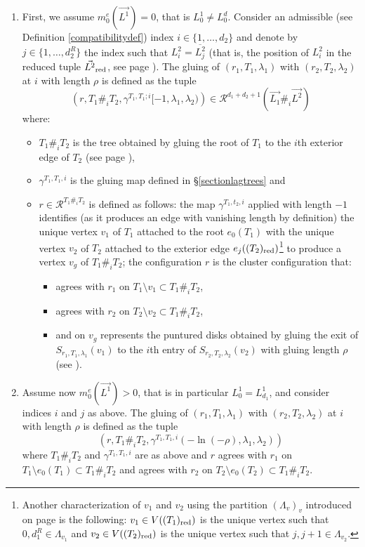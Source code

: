 \begin{enumerate}
	\item First, we assume $m_0^e(\vec{L^1})=0$, that is $L_0^1\neq L_0^d$. Consider an admissible (see Definition \ref{compatibilitydef}) index $i\in \{1,\ldots, d_2\}$ and denote by $j\in \{1,\ldots, d_2^R\}$ the index such that $L_i^2=\overline{L_j^2}$ (that is, the position of $L_i^2$ in the reduced tuple $\vec{L^2}_\textnormal{red}$, see page \pageref{defreducedtuple}). The gluing of $(r_1,T_1,\lambda_1)$ with $(r_2,T_2,\lambda_2)$ at $i$ with length $\rho$ is defined as the tuple $$\left(r,T_1\#_iT_2,\gamma^{T_1,T_1;i}[-1,\lambda_1,\lambda_2)\right)\in \mathcal{R}^{d_1+d_2+1}(\vec{L_1}\#_i\vec{L^2})$$ where:\begin{itemize}
		\item $T_1\#_iT_2$ is the tree obtained by gluing the root of $T_1$ to the $i$th exterior edge of $T_2$ (see page \pageref{compatibilitydef}),
		\item $\gamma^{T_1,T_1,i}$ is the gluing map defined in \S \ref{sectionlagtrees} and 
		\item $r\in \mathcal{R}^{T_1\#_iT_2}$ is defined as follows: the map $\gamma^{T_1,t_2,i}$ applied with length $-1$ identifies (as it produces an edge with vanishing length by definition) the unique vertex $v_1$ of $T_1$ attached to the root $e_0(T_1)$ with the unique vertex $v_2$ of $T_2$ attached to the exterior edge $e_j((T_2)_\textnormal{red})$\footnote{Another characterization of $v_1$ and $v_2$ using the partition $(\Lambda_v)_v$ introduced on page \pageref{Lambdav} is the following: $v_1\in V((T_1)_\textnormal{red})$ is the unique vertex such that $0,d_1^R\in \Lambda_{v_1}$ and $v_2\in V((T_2)_\textnormal{red})$ is the unique vertex such that $j,j+1\in \Lambda_{v_2}$.} to produce a vertex $v_g$ of $T_1\#_iT_2$; the configuration $r$ is the cluster configuration that: \begin{itemize}
			\item agrees with $r_1$ on $T_1\setminus v_1\subset T_1\#_iT_2$,
			\item agrees with $r_2$ on $T_2\setminus v_2\subset T_1\#_iT_2$,
			\item and on $v_g$ represents the puntured disks obtained by gluing the exit of $S_{r_1,T_1,\lambda_1}(v_1)$ to the $i$th entry of $S_{r_2,T_2,\lambda_2}(v_2)$ with gluing length $\rho$ (see \cite[Section (9e)]{Se:book-fukaya-categ}).
		\end{itemize} 
	\end{itemize}  
	\item Assume now $m_0^e(\vec{L^1})>0$, that is in particular $L_0^1=L_{d_1}^1$, and consider indices $i$ and $j$ as above. The gluing of $(r_1,T_1,\lambda_1)$ with $(r_2,T_2,\lambda_2)$ at $i$ with length $\rho$ is defined as the tuple $$\left(r,T_1\#_iT_2,\gamma^{T_1,T_1,i}(-\ln(-\rho),\lambda_1,\lambda_2)\right)$$ where $T_1\#_iT_2$ and $\gamma^{T_1,T_1,i}$ are as above and $r$ agrees with $r_1$ on $T_1\setminus e_0(T_1)\subset T_1\#_iT_2$ and agrees with $r_2$ on $T_2\setminus e_0(T_2)\subset T_1\#_iT_2$. 
\end{enumerate}

